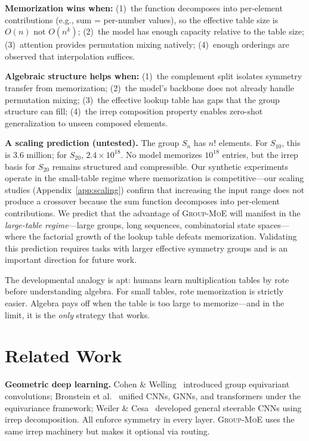 \documentclass[10pt, letterpaper]{article}
\newcommand{\gmoe}{\textsc{Group-MoE}}
\begin{document}
\textbf{Memorization wins when:} (1)~the function decomposes into per-element contributions (e.g., sum = per-number values), so the effective table size is $O(n)$ not $O(n^k)$; (2)~the model has enough capacity relative to the table size; (3)~attention provides permutation mixing natively; (4)~enough orderings are observed that interpolation suffices.

\textbf{Algebraic structure helps when:} (1)~the complement split isolates symmetry transfer from memorization; (2)~the model's backbone does not already handle permutation mixing; (3)~the effective lookup table has gaps that the group structure can fill; (4)~the irrep composition property enables zero-shot generalization to unseen composed elements.

\textbf{A scaling prediction (untested).} The group $S_n$ has $n!$ elements. For $S_{10}$, this is 3.6 million; for $S_{20}$, $2.4 \times 10^{18}$. No model memorizes $10^{18}$ entries, but the irrep basis for $S_{20}$ remains structured and compressible. Our synthetic experiments operate in the small-table regime where memorization is competitive---our scaling studies (Appendix~\ref{app:scaling}) confirm that increasing the input range does not produce a crossover because the sum function decomposes into per-element contributions. We predict that the advantage of \gmoe{} will manifest in the \emph{large-table regime}---large groups, long sequences, combinatorial state spaces---where the factorial growth of the lookup table defeats memorization. Validating this prediction requires tasks with larger effective symmetry groups and is an important direction for future work.

The developmental analogy is apt: humans learn multiplication tables by rote before understanding algebra. For small tables, rote memorization is strictly easier. Algebra pays off when the table is too large to memorize---and in the limit, it is the \emph{only} strategy that works.

\section{Related Work}
\label{sec:related}

\textbf{Geometric deep learning.} Cohen \& Welling~\cite{cohen2016group} introduced group equivariant convolutions; Bronstein et al.~\cite{bronstein2021geometric} unified CNNs, GNNs, and transformers under the equivariance framework; Weiler \& Cesa~\cite{weiler2019general} developed general steerable CNNs using irrep decomposition. All enforce symmetry in every layer. \gmoe{} uses the same irrep machinery but makes it optional via routing.
\end{document}
